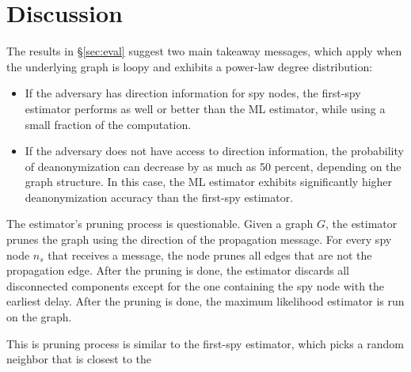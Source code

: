 \section{Discussion}

The results in \S\ref{sec:eval} suggest two main takeaway messages, which apply when the underlying graph is loopy and exhibits a power-law degree distribution:
\begin{itemize}
\item If the adversary has direction information for spy nodes, the first-spy estimator performs as well or better than the ML estimator, while using a small fraction of the computation.
\item If the adversary does not have access to direction information, the probability of deanonymization can decrease by as much as 50 percent, depending on the graph structure. In this case, the ML estimator exhibits significantly higher deanonymization accuracy than the first-spy estimator.
\end{itemize} 

%

The estimator's pruning process is questionable. Given a graph $G$, the estimator prunes the graph using the direction of the propagation message. For every spy node $n_s$ that receives a message, the node prunes all edges that are not the propagation edge. After the pruning is done, the estimator discards all disconnected components except for the one containing the spy node with the earliest delay. After the pruning is done, the maximum likelihood estimator is run on the graph.

This is pruning process is similar to the first-spy estimator, which picks a random neighbor that is closest to the 
